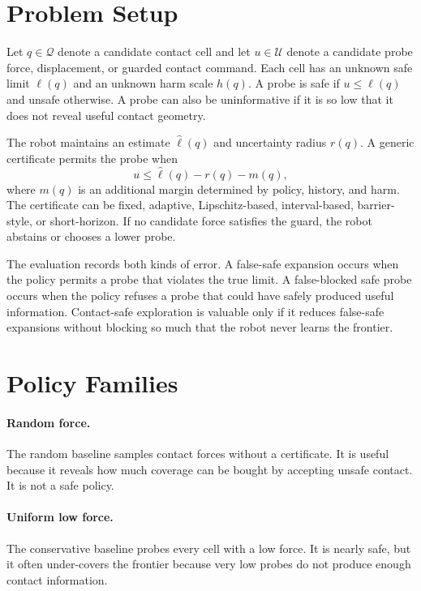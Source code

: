 \documentclass{article}
\begin{document}
\section{Problem Setup}

Let $q \in \mathcal{Q}$ denote a candidate contact cell and let $u \in
\mathcal{U}$ denote a candidate probe force, displacement, or guarded contact
command. Each cell has an unknown safe limit $\ell(q)$ and an unknown harm
scale $h(q)$. A probe is safe if $u \leq \ell(q)$ and unsafe otherwise. A
probe can also be uninformative if it is so low that it does not reveal useful
contact geometry.

The robot maintains an estimate $\hat{\ell}(q)$ and uncertainty radius
$r(q)$. A generic certificate permits the probe when
\[
  u \leq \hat{\ell}(q) - r(q) - m(q),
\]
where $m(q)$ is an additional margin determined by policy, history, and harm.
The certificate can be fixed, adaptive, Lipschitz-based, interval-based,
barrier-style, or short-horizon. If no candidate force satisfies the guard, the
robot abstains or chooses a lower probe.

The evaluation records both kinds of error. A false-safe expansion occurs when
the policy permits a probe that violates the true limit. A false-blocked safe
probe occurs when the policy refuses a probe that could have safely produced
useful information. Contact-safe exploration is valuable only if it reduces
false-safe expansions without blocking so much that the robot never learns the
frontier.

\section{Policy Families}

\paragraph{Random force.}
The random baseline samples contact forces without a certificate. It is useful
because it reveals how much coverage can be bought by accepting unsafe contact.
It is not a safe policy.

\paragraph{Uniform low force.}
The conservative baseline probes every cell with a low force. It is nearly
safe, but it often under-covers the frontier because very low probes do not
produce enough contact information.
\end{document}

